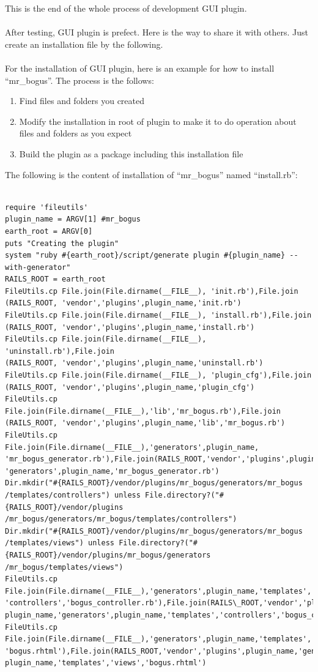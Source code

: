 \documentclass[10pt,oneside]{article}
\begin{document}
This is the end of the whole process of development GUI plugin. \\
\\
After testing, GUI plugin is prefect. Here is the way to share it with others. Just create an installation file by the following.\\
\\
For the installation of GUI plugin, here is an example for how to install “mr\_bogus”. The process is the follows:\\
\begin{enumerate}
\item Find files and folders you created\\
\item Modify the installation in root of plugin to make it to do operation about files and folders as you expect\\
\item Build the plugin as a package including this installation file\\
\end{enumerate}
The following is the content of installation of “mr\_bogus” named “install.rb”:\\
\\
\begin{verbatim}
require 'fileutils' 
plugin_name = ARGV[1] #mr_bogus 
earth_root = ARGV[0]  
puts "Creating the plugin" 
system "ruby #{earth_root}/script/generate plugin #{plugin_name} --with-generator" 
RAILS_ROOT = earth_root 
FileUtils.cp File.join(File.dirname(__FILE__), 'init.rb'),File.join
(RAILS_ROOT, 'vendor','plugins',plugin_name,'init.rb')  
FileUtils.cp File.join(File.dirname(__FILE__), 'install.rb'),File.join
(RAILS_ROOT, 'vendor','plugins',plugin_name,'install.rb')  
FileUtils.cp File.join(File.dirname(__FILE__), 'uninstall.rb'),File.join
(RAILS_ROOT, 'vendor','plugins',plugin_name,'uninstall.rb')  
FileUtils.cp File.join(File.dirname(__FILE__), 'plugin_cfg'),File.join
(RAILS_ROOT, 'vendor','plugins',plugin_name,'plugin_cfg') 
FileUtils.cp File.join(File.dirname(__FILE__),'lib','mr_bogus.rb'),File.join
(RAILS_ROOT, 'vendor','plugins',plugin_name,'lib','mr_bogus.rb')  
FileUtils.cp File.join(File.dirname(__FILE__),'generators',plugin_name,
'mr_bogus_generator.rb'),File.join(RAILS_ROOT,'vendor','plugins',plugin_name,
'generators',plugin_name,'mr_bogus_generator.rb')  
Dir.mkdir("#{RAILS_ROOT}/vendor/plugins/mr_bogus/generators/mr_bogus
/templates/controllers") unless File.directory?("#{RAILS_ROOT}/vendor/plugins
/mr_bogus/generators/mr_bogus/templates/controllers") 
Dir.mkdir("#{RAILS_ROOT}/vendor/plugins/mr_bogus/generators/mr_bogus
/templates/views") unless File.directory?("#{RAILS_ROOT}/vendor/plugins/mr_bogus/generators
/mr_bogus/templates/views") 
FileUtils.cp File.join(File.dirname(__FILE__),'generators',plugin_name,'templates',
'controllers','bogus_controller.rb'),File.join(RAILS\_ROOT,'vendor','plugins',
plugin_name,'generators',plugin_name,'templates','controllers','bogus_controller.rb') 
FileUtils.cp File.join(File.dirname(__FILE__),'generators',plugin_name,'templates','views',
'bogus.rhtml'),File.join(RAILS_ROOT,'vendor','plugins',plugin_name,'generators',
plugin_name,'templates','views','bogus.rhtml') 
\end{verbatim}
\end{document}
